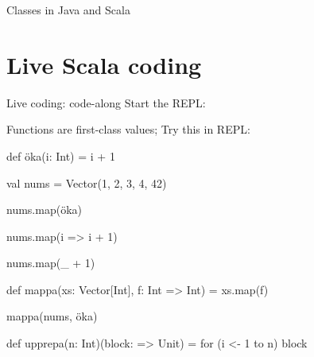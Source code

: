 \documentclass{lecturenotes}
\begin{document}
\begin{Slide}{Classes in Java and Scala}
\vspace{-1.5em}
\begin{multicols}{2}


\columnbreak

\pause


\pause


\end{multicols}

\end{Slide}

\section[Live Scala coding]{Live Scala coding}

\begin{Slide}{Live coding: code-along}
Start the REPL:

\end{Slide}


\begin{Slide}{Functions are first-class values; Try this in REPL:}
\begin{REPL}[basicstyle=\color{white}\ttfamily\fontsize{8.5}{10}\selectfont]
def öka(i: Int) = i + 1

val nums = Vector(1, 2, 3, 4, 42)

nums.map(öka)

nums.map(i => i + 1)

nums.map(_ + 1)

def mappa(xs: Vector[Int], f: Int => Int) = xs.map(f)  

mappa(nums, öka)

def upprepa(n: Int)(block: => Unit) = for (i <- 1 to n) block
\end{REPL}

\end{Slide}
\end{document}
